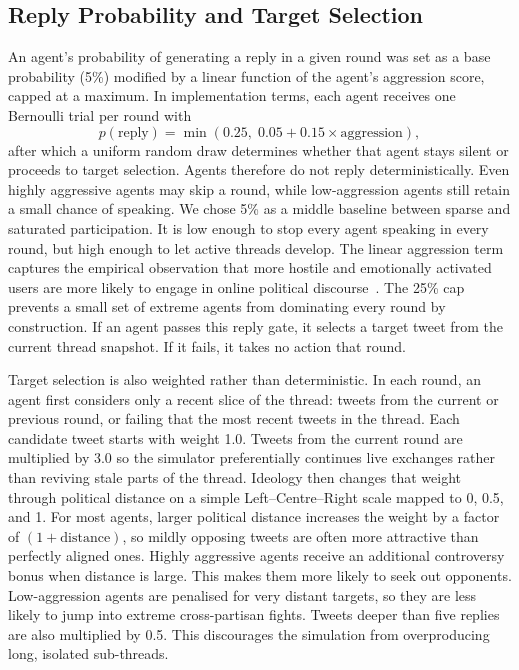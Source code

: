 \documentclass[logo,bsc,singlespacing,parskip,online]{infthesis}
\begin{document}
\subsection{Reply Probability and Target Selection}

An agent's probability of generating a reply in a given round was set as a base probability (5\%) modified by a linear function of the agent's aggression score, capped at a maximum. In implementation terms, each agent receives one Bernoulli trial per round with
\[
p(\text{reply}) = \min(0.25,\; 0.05 + 0.15 \times \text{aggression}),
\]
after which a uniform random draw determines whether that agent stays silent or proceeds to target selection. Agents therefore do not reply deterministically. Even highly aggressive agents may skip a round, while low-aggression agents still retain a small chance of speaking. We chose 5\% as a middle baseline between sparse and saturated participation. It is low enough to stop every agent speaking in every round, but high enough to let active threads develop. The linear aggression term captures the empirical observation that more hostile and emotionally activated users are more likely to engage in online political discourse~\citep{antypas2023negativity,brady2017emotion}. The 25\% cap prevents a small set of extreme agents from dominating every round by construction. If an agent passes this reply gate, it selects a target tweet from the current thread snapshot. If it fails, it takes no action that round.

Target selection is also weighted rather than deterministic. In each round, an agent first considers only a recent slice of the thread: tweets from the current or previous round, or failing that the most recent tweets in the thread. Each candidate tweet starts with weight 1.0. Tweets from the current round are multiplied by 3.0 so the simulator preferentially continues live exchanges rather than reviving stale parts of the thread. Ideology then changes that weight through political distance on a simple Left--Centre--Right scale mapped to 0, 0.5, and 1. For most agents, larger political distance increases the weight by a factor of $(1 + \text{distance})$, so mildly opposing tweets are often more attractive than perfectly aligned ones. Highly aggressive agents receive an additional controversy bonus when distance is large. This makes them more likely to seek out opponents. Low-aggression agents are penalised for very distant targets, so they are less likely to jump into extreme cross-partisan fights. Tweets deeper than five replies are also multiplied by 0.5. This discourages the simulation from overproducing long, isolated sub-threads.
\end{document}

